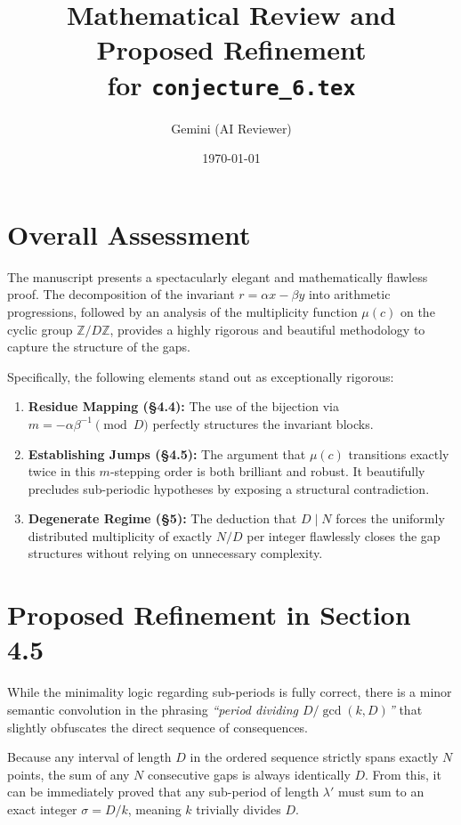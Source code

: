 \documentclass[11pt]{article}
\title{Mathematical Review and Proposed Refinement\\ for \texttt{conjecture\_6.tex}}
\author{Gemini (AI Reviewer)}
\date{\today}
\begin{document}
\maketitle

\section{Overall Assessment}

The manuscript presents a spectacularly elegant and mathematically flawless proof. The decomposition of the invariant $r = \alpha x - \beta y$ into arithmetic progressions, followed by an analysis of the multiplicity function $\mu(c)$ on the cyclic group $\mathbb{Z}/D\mathbb{Z}$, provides a highly rigorous and beautiful methodology to capture the structure of the gaps.

Specifically, the following elements stand out as exceptionally rigorous:
\begin{enumerate}
    \item \textbf{Residue Mapping (\S 4.4):} The use of the bijection via $m = -\alpha\beta^{-1} \pmod D$ perfectly structures the invariant blocks.
    \item \textbf{Establishing Jumps (\S 4.5):} The argument that $\mu(c)$ transitions exactly twice in this $m$-stepping order is both brilliant and robust. It beautifully precludes sub-periodic hypotheses by exposing a structural contradiction.
    \item \textbf{Degenerate Regime (\S 5):} The deduction that $D \mid N$ forces the uniformly distributed multiplicity of exactly $N/D$ per integer flawlessly closes the gap structures without relying on unnecessary complexity.
\end{enumerate}

\section{Proposed Refinement in Section 4.5}

While the minimality logic regarding sub-periods is fully correct, there is a minor semantic convolution in the phrasing \textit{``period dividing $D/\gcd(k, D)$''} that slightly obfuscates the direct sequence of consequences. 

Because any interval of length $D$ in the ordered sequence strictly spans exactly $N$ points, the sum of any $N$ consecutive gaps is always identically $D$. From this, it can be immediately proved that any sub-period of length $\lambda'$ must sum to an exact integer $\sigma = D/k$, meaning $k$ trivially divides $D$.
\end{document}
